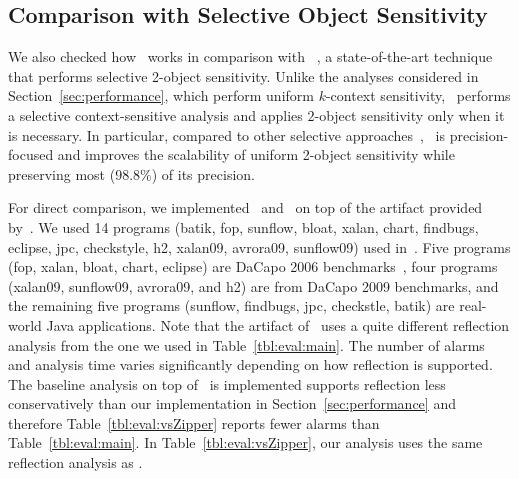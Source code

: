 %

\subsection{Comparison with Selective Object Sensitivity}\label{sec:SelectiveCtx}

We also checked how \ours~works in comparison with \Zipper~\cite{Li2018a,ZipperJournal20}, a state-of-the-art technique that performs selective 2-object sensitivity. 
Unlike the analyses considered in Section~\ref{sec:performance}, which perform uniform $k$-context sensitivity,  \Zipper~performs a selective context-sensitive analysis and applies $2$-object sensitivity only when it is necessary. In particular, compared to other selective approaches~\cite{Li2018b,JeJeChOh17,Smaragdakis2014,Graphick20}, \Zipper~is precision-focused and 
improves the scalability of uniform 2-object sensitivity while preserving most (98.8\%) of its precision. 
%

For direct comparison, we implemented \ours~and \oneobjHT~on top of the artifact provided by~\cite{Li2018a}.
We used 14 programs (batik, fop, sunflow, bloat, xalan, chart, findbugs, eclipse, jpc, checkstyle, h2, xalan09, avrora09, sunflow09) used in~\cite{Li2018a}.
Five programs (fop, xalan, bloat, chart, eclipse) are DaCapo 2006 benchmarks~\cite{Blackburn2006}, four programs (xalan09, sunflow09, avrora09, and h2) are from DaCapo 2009 benchmarks, and the remaining five programs (sunflow, findbugs, jpc, checkstle, batik) are real-world Java applications.
Note that the artifact of~\cite{Li2018a} uses a quite different reflection analysis from the one we used in Table~\ref{tbl:eval:main}.
The number of alarms and analysis time varies significantly depending on how reflection is supported. 
The baseline analysis on top of \Zipper~is implemented supports reflection less conservatively than our implementation in Section~\ref{sec:performance} and therefore Table~\ref{tbl:eval:vsZipper} reports fewer alarms than Table~\ref{tbl:eval:main}. In Table~\ref{tbl:eval:vsZipper}, our analysis uses the same reflection analysis as \Zipper. 


